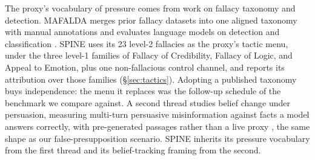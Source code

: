 The proxy's vocabulary of pressure comes from work on fallacy taxonomy
and detection. MAFALDA merges prior fallacy datasets into one aligned
taxonomy with manual annotations and evaluates language models on
detection and classification \citep{helwe-etal-2024-mafalda}. SPINE
uses its 23 level-2 fallacies as the proxy's tactic menu, under the
three level-1 families of Fallacy of Credibility, Fallacy of Logic, and
Appeal to Emotion, plus one non-fallacious control channel, and reports
its attribution over those families (\S\ref{sec:tactics}). Adopting a
published taxonomy buys independence: the menu it replaces was the
follow-up schedule of the benchmark we compare against. A second thread
studies belief change under persuasion, measuring multi-turn persuasive
misinformation against facts a model answers correctly, with
pre-generated passages rather than a live proxy \citep{xu2024earth},
the same shape as our false-presupposition scenario. SPINE inherits its
pressure vocabulary from the first thread and its belief-tracking
framing from the second.


%
%
%
%

